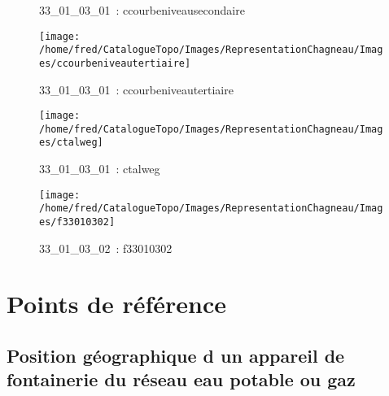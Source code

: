 \documentclass[12pt,titlepage]{book}
\begin{document}
\begin{figure}[h!]
\begin{minipage}[t]{3cm}
\begin{center}
      \caption[~33\_01\_03\_01]{\small{33\_01\_03\_01~:} \tiny{ccourbeniveausecondaire}}\label{ccourbeniveausecondaire}
    \end{center}
  \end{minipage}
  \begin{minipage}[t]{3cm}
    \begin{center}
      \texttt{[image: /home/fred/CatalogueTopo/Images/RepresentationChagneau/Images/ccourbeniveautertiaire]}
      \caption[~33\_01\_03\_01]{\small{33\_01\_03\_01~:} \tiny{ccourbeniveautertiaire}}\label{ccourbeniveautertiaire}
    \end{center}
  \end{minipage}
  \begin{minipage}[t]{3cm}
    \begin{center}
      \texttt{[image: /home/fred/CatalogueTopo/Images/RepresentationChagneau/Images/ctalweg]}
      \caption[~33\_01\_03\_01]{\small{33\_01\_03\_01~:} \tiny{ctalweg}}\label{ctalweg}
    \end{center}
  \end{minipage}
  \begin{minipage}[t]{3cm}
    \begin{center}
      \texttt{[image: /home/fred/CatalogueTopo/Images/RepresentationChagneau/Images/f33010302]}
      \caption[~33\_01\_03\_02]{\small{33\_01\_03\_02~:} \tiny{f33010302}}\label{f33010302}
    \end{center}
  \end{minipage}
\end{figure}

\section{\large Points de référence}
\subsection{Position géographique d un appareil de fontainerie du réseau eau potable ou gaz}
\noindent
\vspace{\baselineskip}
\end{document}
